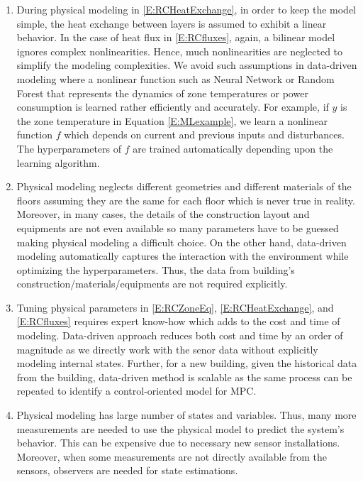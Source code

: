 \begin{enumerate}
	\item \textcolor[rgb]{0,0,1}{
	During physical modeling in \eqref{E:RCHeatExchange}, in order to keep the model simple, the heat exchange between layers is assumed to exhibit a linear behavior. 
	In the case of heat flux in \eqref{E:RCfluxes}, again, a bilinear model ignores complex nonlinearities.
	Hence, much nonlinearities are neglected to simplify the modeling complexities.
	We avoid such assumptions in data-driven modeling where a nonlinear function such as Neural Network or Random Forest that represents the dynamics of zone temperatures or power consumption is learned rather efficiently and accurately. 
	For example, if \(y\) is the zone temperature in Equation \eqref{E:MLexample}, we learn a nonlinear function \(f\) which depends on current and previous inputs and disturbances. 
	The hyperparameters of \(f\) are trained automatically depending upon the learning algorithm.}
	\item \textcolor[rgb]{0,0,1}{
	Physical modeling neglects different geometries and different materials of the floors assuming they are the same for each floor which is never true in reality.
	Moreover, in many cases, the details of the construction layout and equipments are not even available so many parameters have to be guessed making physical modeling a difficult choice.
	On the other hand, data-driven modeling automatically captures the interaction with the environment while optimizing the hyperparameters. Thus, the data from building's construction/materials/equipments are not required explicitly.}
	\item \textcolor[rgb]{0,0,1}{
	Tuning physical parameters in \eqref{E:RCZoneEq}, \eqref{E:RCHeatExchange}, and \eqref{E:RCfluxes} requires expert know-how which adds to the cost and time of modeling.
	Data-driven approach reduces both cost and time by an order of magnitude as we directly work with the senor data without explicitly modeling internal states.
	Further, for a new building, given the historical data from the building, data-driven method is scalable as the same process can be repeated to identify a control-oriented model for MPC.}
	\item \textcolor[rgb]{0,0,1}{
	Physical modeling has large number of states and variables.
	Thus, many more measurements are needed to use the physical model to predict the system's behavior.
	This can be expensive due to necessary new sensor installations.
	Moreover, when some measurements are not directly available from the sensors, observers are needed for state estimations.
}
\end{enumerate}
